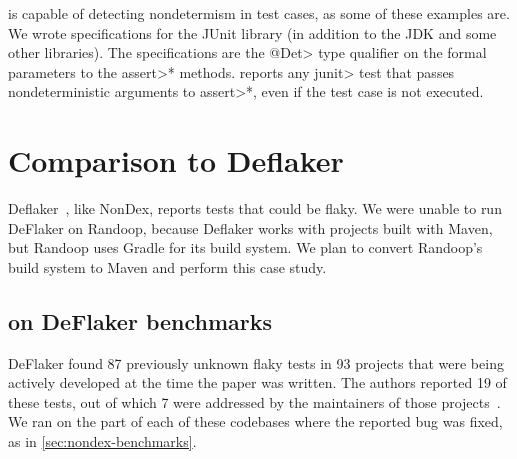 \TheDeterminismChecker is capable of detecting nondetermism in test
cases, as some of these examples are.
We wrote specifications for the
JUnit library (in addition to the JDK and some other libraries).
The specifications are the \<@Det> type qualifier on the formal parameters
to the \<assert>* methods.
\TheDeterminismChecker reports any \<junit> test that passes nondeterministic arguments to
\<assert>*, even if the test case is not executed.


\section{Comparison to Deflaker}
Deflaker~\cite{deflaker}, like NonDex, reports tests that could be flaky. 
We were unable to run DeFlaker on Randoop, because Deflaker works with
projects built with Maven, but Randoop
uses Gradle for its build system. We plan to convert Randoop's build system to Maven and
perform this case study.

\subsection{\TheDeterminismChecker on DeFlaker benchmarks}\label{sec:deflaker-benchmarks}
DeFlaker found 87 previously unknown flaky tests in 93 projects that were being actively developed at the time
the paper was written. The authors reported 19 of these tests, out of which 7 were addressed by the maintainers of
those projects~\cite{deflaker}.
We ran \theDeterminismChecker on the part of each of these
codebases where the reported bug was fixed, as in \cref{sec:nondex-benchmarks}.

